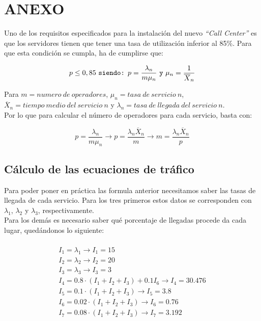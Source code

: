 \section{ANEXO}
Uno de los requisitos especificados para la instalación del nuevo \emph{``Call Center''} es que los servidores tienen que tener una tasa de utilización inferior al 85\%. Para que esta condición se cumpla, ha de cumplirse que:

\begin{equation}
p \leq 0,85 \text{ \texttt{siendo:} }
p = \frac{\lambda_{n}}{m\mu_{n}} \text{ \texttt{y} } \mu_{n}= \frac{1}{\overline{X}_{n}}
\end{equation}

Para $m= numero\ de\ operadores$, $\mu_{n} = tasa\ de\ servicio\ n$, $\overline{X}_{n} = tiempo\ medio\ del\ servicio\ n$ y $\lambda_{n} = tasa\ de\ llegada\ del\ servicio\ n$.\\
Por lo que para calcular el número de operadores para cada servicio, basta con:

\begin{equation}
p = \frac{\lambda_{n}}{m\mu_{n}} \rightarrow p = \frac{\lambda_{n}\overline{X}_{n}}{m} \rightarrow m = \frac{\lambda_{n}\overline{X}_{n}}{p}
\end{equation}

\subsection{Cálculo de las ecuaciones de tráfico}
Para poder poner en práctica las formula anterior necesitamos saber las tasas de llegada de cada servicio. Para los tres primeros estos datos se corresponden con $\lambda_{1}$, $\lambda_{2}$ y $\lambda_{3}$, respectivamente.\\

Para los demás es necesario saber qué porcentaje de llegadas procede da cada lugar, quedándonos lo siguiente:

\begin{multline}\\
  I_{1} = \lambda_{1} \rightarrow I_{1} = 15 \\
  I_{2} = \lambda_{2} \rightarrow I_{2} = 20 \\
  I_{3} = \lambda_{3} \rightarrow I_{3} = 3 \\
  I_{4} = 0.8\cdot (I_{1}+I_{2}+I_{3}) + 0.1I_{6} \rightarrow I_{4} = 30.476 \\
  I_{5} = 0.1\cdot (I_{1}+I_{2}+I_{3})  \rightarrow I_{5} = 3.8 \\
  I_{6} = 0.02\cdot (I_{1}+I_{2}+I_{3})  \rightarrow I_{6} = 0.76 \\
  I_{7} = 0.08\cdot (I_{1}+I_{2}+I_{3})  \rightarrow I_{7} = 3.192 \\
  \end{multline}

